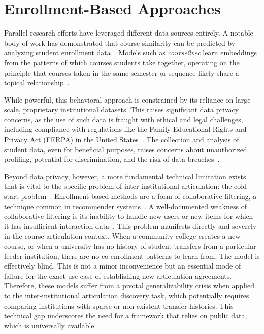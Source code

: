 \section{Enrollment-Based Approaches}\label{ch:2.5}
Parallel research efforts have leveraged different data sources entirely.  A notable body of work has demonstrated that course similarity can be predicted by analyzing student enrollment data~\cite{pardos2018connectionistrecommendationwildutility, JiangPardosMulti2VecEDM2020}.  Models such as \emph{course2vec} learn embeddings from the patterns of which courses students take together, operating on the principle that courses taken in the same semester or sequence likely share a topical relationship~\cite{pardos2018connectionistrecommendationwildutility}.

While powerful, this behavioral approach is constrained by its reliance on large-scale, proprietary institutional datasets. This raises significant data privacy concerns, as the use of such data is fraught with ethical and legal challenges, including compliance with regulations like the Family Educational Rights and Privacy Act (FERPA) in the United States~\cite{sabourin2015}. The collection and analysis of student data, even for beneficial purposes, raises concerns about unauthorized profiling, potential for discrimination, and the risk of data breaches~\cite{sabourin2015}.

Beyond data privacy, however, a more fundamental technical limitation exists that is vital to the specific problem of inter-institutional articulation: the cold-start problem~\cite{10246926,10339320,googlerecommendation}. Enrollment-based methods are a form of collaborative filtering, a technique common in recommender systems~\cite{10246926}. A well-documented weakness of collaborative filtering is its inability to handle new users or new items for which it has insufficient interaction data~\cite{10246926,10339320,googlerecommendation}. This problem manifests directly and severely in the course articulation context. When a community college creates a new course, or when a university has no history of student transfers from a particular feeder institution, there are no co-enrollment patterns to learn from. The model is effectively blind. This is not a minor inconvenience but an essential mode of failure for the exact use case of establishing new articulation agreements. Therefore, these models suffer from a pivotal generalizability crisis when applied to the inter-institutional articulation discovery task, which potentially requires comparing institutions with sparse or non-existent transfer histories. This technical gap underscores the need for a framework that relies on public data, which is universally available.


